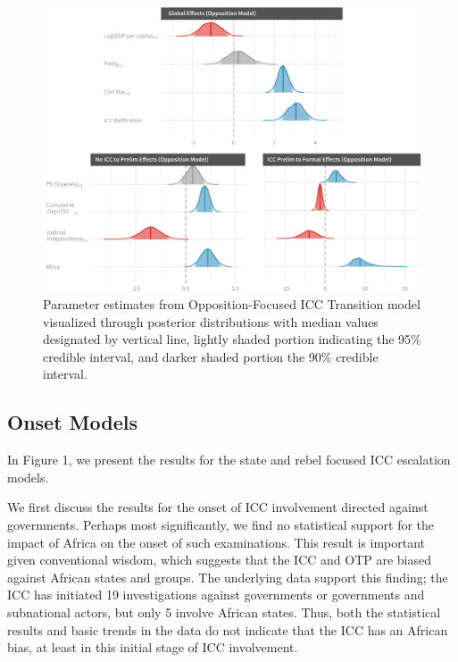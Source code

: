\begin{figure}
    \centering
    \includegraphics[width=1\textwidth]{rebelCoefSumm.pdf}
    \caption{Parameter estimates from Opposition-Focused ICC Transition model visualized through posterior distributions with median values designated by vertical line, lightly shaded portion indicating the 95\% credible interval, and darker shaded portion the 90\% credible interval.}
    \label{fig:rebelModel}
\end{figure}



\subsection*{Onset Models}

In Figure 1, we present the results for the state and rebel focused ICC escalation models.

We first discuss the results for the onset of ICC involvement directed against governments.  Perhaps most significantly, we find no statistical support for the impact of Africa on the onset of such examinations. This result is important given conventional wisdom, which suggests that the ICC and OTP are biased against African states and groups.  The underlying data support this finding; the ICC has initiated 19 investigations against governments or governments and subnational actors, but only 5 involve African states. Thus, both the statistical results and basic trends in the data do not indicate that the ICC has an African bias, at least in this initial stage of ICC involvement.

